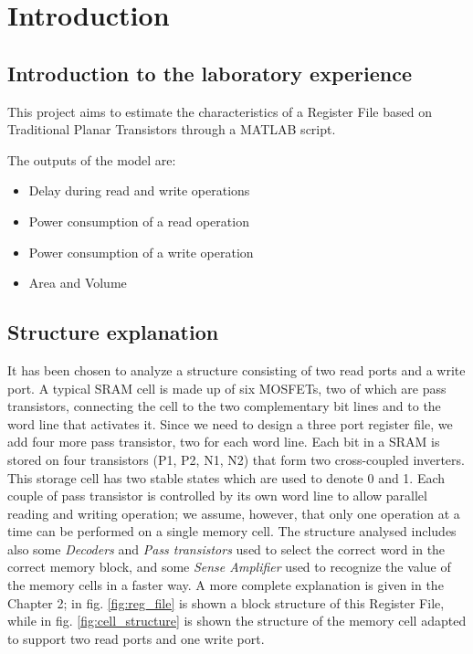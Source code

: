 \chapter{Introduction}
\graphicspath{{foto/Chap1/}}
\section{Introduction to the laboratory experience}
This project aims to estimate the characteristics of a Register File based on Traditional Planar Transistors through a MATLAB script.

The outputs of the model are:
\begin{itemize}
\item Delay during read and write operations
\item Power consumption of a read operation
\item Power consumption of a write operation
\item Area and Volume
\end{itemize}

\section{Structure explanation}
It has been chosen to analyze a structure consisting of two read ports and a write port. A typical SRAM cell is made up of six MOSFETs, two of which are pass transistors, connecting the cell to the two complementary bit lines and to the word line that activates it. Since we need to design a three port register file, we add four more pass transistor, two for each word line. Each bit in a SRAM is stored on four transistors (P1, P2, N1, N2) that form two cross-coupled inverters. This storage cell has two stable states which are used to denote 0 and 1. Each couple of pass transistor is controlled by its own word line to allow parallel reading and writing operation; we assume, however, that only one operation at a time can be performed on a single memory cell. The structure analysed includes also some \textit{Decoders} and \textit{Pass transistors} used to select the correct word in the correct memory block, and some \textit{Sense Amplifier} used to recognize the value of the memory cells in a faster way. A more complete explanation is given in the Chapter 2; in fig. \ref{fig:reg_file} is shown a block structure of this Register File, while in fig. \ref{fig:cell_structure} is shown the structure of the memory cell adapted to support two read ports and one write port. 

